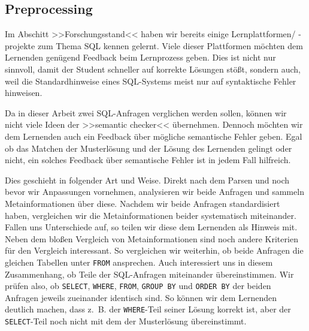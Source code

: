 
\subsection{Preprocessing}
\label{subsec:preprocessing}

Im Abschitt >>Forschungsstand<< haben wir bereits einige Lernplattformen/ -projekte zum Thema SQL kennen gelernt. Viele dieser Plattformen möchten dem Lernenden genügend Feedback beim Lernprozess geben. Dies ist nicht nur sinnvoll, damit der Student schneller auf korrekte Lösungen stößt, sondern auch, weil die Standardhinweise eines SQL-Systems meist nur auf syntaktische Fehler hinweisen.

Da in dieser Arbeit zwei SQL-Anfragen verglichen werden sollen, können wir nicht viele Ideen der >>semantic checker<< übernehmen. Dennoch möchten wir dem Lernenden auch ein Feedback über mögliche semantische Fehler geben. Egal ob das Matchen der Musterlösung und der Lösung des Lernenden gelingt oder nicht, ein solches Feedback über semantische Fehler ist in jedem Fall hilfreich.

Dies geschieht in folgender Art und Weise. Direkt nach dem Parsen und noch bevor wir Anpassungen vornehmen, analysieren wir beide Anfragen und sammeln Metainformationen über diese. Nachdem wir beide Anfragen standardisiert haben, vergleichen wir die Metainformationen beider systematisch miteinander. Fallen uns Unterschiede auf, so teilen wir diese dem Lernenden als Hinweis mit. Neben dem bloßen Vergleich von Metainformationen sind noch andere Kriterien für den Vergleich interessant. So vergleichen wir weiterhin, ob beide Anfragen die gleichen Tabellen unter \verb|FROM| ansprechen. Auch interessiert uns in diesem Zusammenhang, ob Teile der SQL-Anfragen miteinander übereinstimmen. Wir prüfen also, ob \verb|SELECT|, \verb|WHERE|, \verb|FROM|, \verb|GROUP BY| und \verb|ORDER BY| der beiden Anfragen jeweils zueinander identisch sind. So können wir dem Lernenden deutlich machen, dass \mbox{z. B.} der \verb|WHERE|-Teil seiner Lösung korrekt ist, aber der \verb|SELECT|-Teil noch nicht mit dem der Musterlösung übereinstimmt.


